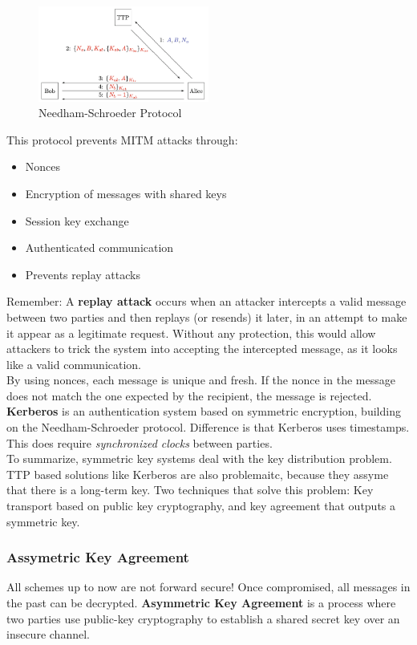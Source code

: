 \begin{figure}[h!]
    \centering
    \includegraphics[width=0.5\textwidth]{img/needham.png}
    \caption{Needham-Schroeder Protocol}
\end{figure}

This protocol prevents MITM attacks through:
\begin{itemize}
    \item Nonces
    \item Encryption of messages with shared keys
    \item Session key exchange
    \item Authenticated communication
    \item Prevents replay attacks
\end{itemize}

Remember: A \textbf{replay attack} occurs when an attacker intercepts a valid message between two parties and then replays (or resends) it later,
in an attempt to make it appear as a legitimate request.
Without any protection, this would allow attackers to trick the system into accepting the intercepted message, as it looks like a valid communication. \\

By using nonces, each message is unique and fresh. If the nonce in the message does not match the one expected by the recipient, the message is rejected. \\

\textbf{Kerberos} is an authentication system based on symmetric encryption, building on the Needham-Schroeder protocol.
Difference is that Kerberos uses timestamps. This does require \emph{synchronized clocks} between parties. \\

To summarize, symmetric key systems deal with the key distribution problem. TTP based solutions like Kerberos are also problemaitc, because
they assyme that there is a long-term key. Two techniques that solve this problem:
Key transport based on public key cryptography, and key agreement that outputs a symmetric key.

\subsubsection{Assymetric Key Agreement}
All schemes up to now are not forward secure! Once compromised, all messages in the past can be decrypted.
\textbf{Asymmetric Key Agreement} is a process where two parties use public-key cryptography to establish a shared secret key over an insecure channel. \\

